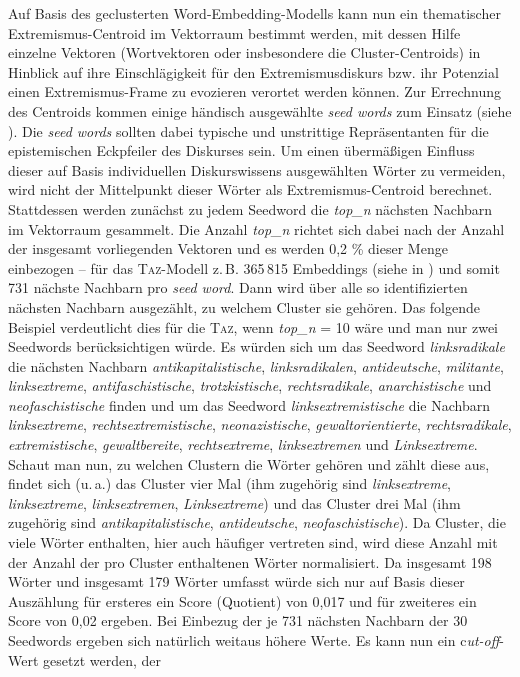 Auf Basis des geclusterten Word-Embedding-Modells kann nun ein thematischer Extremismus-Centroid im Vektorraum bestimmt werden, mit dessen Hilfe einzelne Vektoren (Wortvektoren oder insbesondere die Cluster-Centroids) in Hinblick auf ihre Einschlägigkeit für den Extremismusdiskurs bzw. ihr Potenzial einen Extremismus-Frame zu evozieren verortet werden können. Zur Errechnung des Centroids kommen einige händisch ausgewählte \emph{seed words} zum Einsatz (siehe ). Die \emph{seed words} sollten dabei typische und unstrittige Repräsentanten für die epistemischen Eckpfeiler des Diskurses sein. Um einen übermäßigen Einfluss dieser auf Basis individuellen Diskurswissens ausgewählten Wörter zu vermeiden, wird nicht der Mittelpunkt dieser Wörter als Extremismus-Centroid berechnet. Stattdessen werden zunächst zu jedem Seedword die \emph{top\_n} nächsten Nachbarn im Vektorraum gesammelt. Die Anzahl \emph{top\_n} richtet sich dabei nach der Anzahl der insgesamt vorliegenden Vektoren und es werden 0,2 \% dieser Menge einbezogen -- für das \textsc{Taz}-Modell z.\,B. 365\,815 Embeddings (siehe  in ) und somit 731 nächste Nachbarn pro \emph{seed word}. Dann wird über alle so identifizierten nächsten Nachbarn ausgezählt, zu welchem Cluster sie gehören. Das folgende Beispiel verdeutlicht dies für die \textsc{Taz}, wenn \emph{top\_n} = 10 wäre und man nur zwei Seedwords berücksichtigen würde. Es würden sich um das Seedword \emph{linksradikale} die nächsten Nachbarn \emph{antikapitalistische}, \emph{linksradikalen}, \emph{antideutsche}, \emph{militante}, \emph{linksextreme}, \emph{antifaschistische}, \emph{trotzkistische}, \emph{rechtsradikale}, \emph{anarchistische} und \emph{neofaschistische} finden und um das Seedword \emph{linksextremistische} die Nachbarn \emph{linksextreme}, \emph{rechtsextremistische}, \emph{neonazistische}, \emph{gewaltorientierte}, \emph{rechtsradikale}, \emph{extremistische}, \emph{gewaltbereite}, \emph{rechtsextreme}, \emph{linksextremen} und \emph{Linksextreme}. Schaut man nun, zu welchen Clustern die Wörter gehören und zählt diese aus, findet sich (u.\,a.) das Cluster  vier Mal (ihm zugehörig sind \emph{linksextreme}, \emph{linksextreme}, \emph{linksextremen}, \emph{Linksextreme}) und das Cluster  drei Mal (ihm zugehörig sind \emph{antikapitalistische}, \emph{antideutsche}, \emph{neofaschistische}). Da Cluster, die viele Wörter enthalten, hier auch häufiger vertreten sind, wird diese Anzahl mit der Anzahl der pro Cluster enthaltenen Wörter normalisiert. Da  insgesamt 198 Wörter und  insgesamt 179 Wörter umfasst würde sich nur auf Basis dieser Auszählung für ersteres ein Score (Quotient) von 0,017 und für zweiteres ein Score von 0,02 ergeben. Bei Einbezug der je 731 nächsten Nachbarn der 30 Seedwords ergeben sich natürlich weitaus höhere Werte. Es kann nun ein c\emph{ut-off}-Wert gesetzt werden, der 